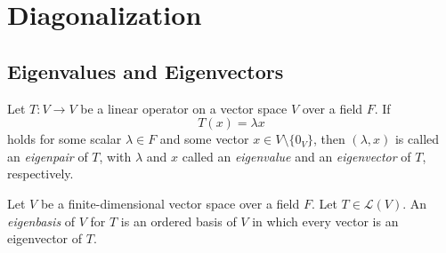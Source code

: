 \chapter{Diagonalization}
\section{Eigenvalues and Eigenvectors}
\begin{definition}
  Let $T: V \to V$ be a linear operator on a vector space $V$ over a field $F$.
  If
  \begin{equation*}
    T(x) = \lambda x
  \end{equation*}
  holds for some scalar $\lambda \in F$ and some vector
  $x \in V \setminus \{0_V\}$, then $(\lambda, x)$ is called an
  \emph{eigenpair} of $T$, with $\lambda$ and $x$ called an
  \emph{eigenvalue} and an \emph{eigenvector} of $T$, respectively.
\end{definition}

\begin{definition}
  Let $V$ be a finite-dimensional vector space over a field $F$.
  Let $T \in \mathcal{L}(V)$.
  An \emph{eigenbasis} of $V$ for $T$ is an ordered basis of $V$ in which every
  vector is an eigenvector of $T$.
\end{definition}

